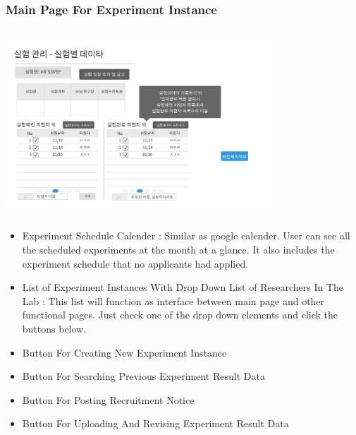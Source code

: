 \documentclass[letterpaper, 10 pt, conference]{ieeeconf}  %
\begin{document}
\subsubsection{Main Page For Experiment Instance\\}
\includegraphics[width=10cm,height = 7cm]{Oven_ver2/18_subMainPage.jpg}


\begin{itemize}
\item Experiment Schedule Calender : Similar as google calender. User can see all the scheduled experiments at the month at a glance. It also includes the experiment schedule that no applicants had applied. 
\item List of Experiment Instances With Drop Down List of Researchers In The Lab : This list will function as interface between main page and other functional pages. Just check one of the drop down elements and click the buttons below. 
\item Button For Creating New Experiment Instance
\item Button For Searching Previous Experiment Result Data
\item Button For Posting Recruitment Notice
\item Button For Uploading And Revising Experiment Result Data

\end{itemize}
\end{document}
